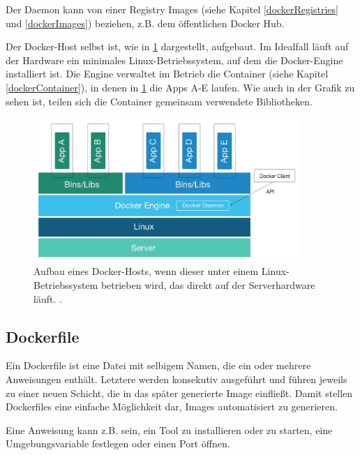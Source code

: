 \documentclass[../main.tex]{subfiles}
\begin{document}
      Der Daemon kann von einer Registry Images (siehe Kapitel \ref{dockerRegistries} und \ref{dockerImages}) beziehen, z.B. dem öffentlichen Docker Hub.

      Der Docker-Host selbst ist, wie in \fig \ref{fig:intro_dockerHost} dargestellt, aufgebaut. Im Idealfall läuft auf der Hardware ein minimales Linux-Betriebssystem, auf dem die Docker-Engine installiert ist. Die Engine verwaltet im Betrieb die Container (siehe Kapitel \ref{dockerContainer}), in denen in \fig \ref{fig:intro_dockerHost} die Apps A-E laufen. Wie auch in der Grafik zu sehen ist, teilen sich die Container gemeinsam verwendete Bibliotheken.%

      \begin{figure}[h]
          \centering
          \includegraphics[width=0.9\textwidth]{./images/intro_dockerHost.jpg}
          \caption{Aufbau eines Docker-Hosts, wenn dieser unter einem Linux-Betriebssystem betrieben wird, das direkt auf der Serverhardware läuft. \cite[S.3]{dockerSecIntro}.}
          \label{fig:intro_dockerHost}
      \end{figure}

		\subsection{Dockerfile}
		\label{dockerDockerfile}
      Ein Dockerfile ist eine Datei mit selbigem Namen, die ein oder mehrere Anweisungen enthält. Letztere werden konsekutiv ausgeführt und führen jeweils zu einer neuen Schicht, die in das später generierte Image einfließt. Damit stellen Dockerfiles eine einfache Möglichkeit dar, Images automatisiert zu generieren.

      Eine Anweisung kann z.B. sein, ein Tool zu installieren oder zu starten, eine Umgebungsvariable festlegen oder einen Port öffnen.
\end{document}
